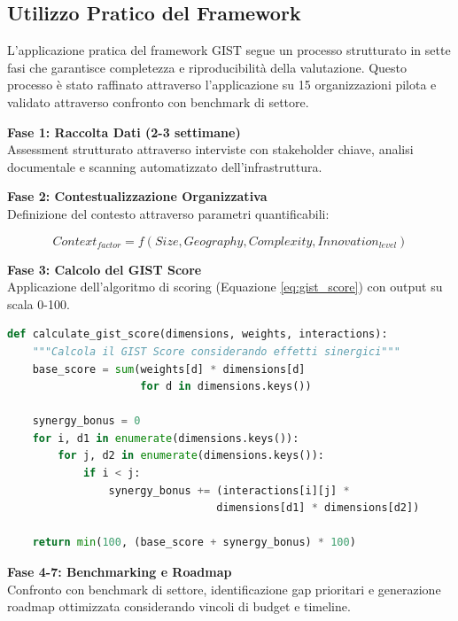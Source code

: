 \subsection{Utilizzo Pratico del Framework}

L'applicazione pratica del framework GIST segue un processo strutturato in sette fasi che garantisce completezza e riproducibilità della valutazione. Questo processo è stato raffinato attraverso l'applicazione su 15 organizzazioni pilota e validato attraverso confronto con benchmark di settore.

\textbf{Fase 1: Raccolta Dati (2-3 settimane)}\\
Assessment strutturato attraverso interviste con stakeholder chiave, analisi documentale e scanning automatizzato dell'infrastruttura.

\textbf{Fase 2: Contestualizzazione Organizzativa}\\
Definizione del contesto attraverso parametri quantificabili:

\begin{equation}
Context_{factor} = f(Size, Geography, Complexity, Innovation_{level})
\label{eq:context_factor}
\end{equation}

\textbf{Fase 3: Calcolo del GIST Score}\\
Applicazione dell'algoritmo di scoring (Equazione \ref{eq:gist_score}) con output su scala 0-100.

\begin{lstlisting}[language=Python, caption=Implementazione del Calcolo GIST Score]
def calculate_gist_score(dimensions, weights, interactions):
    """Calcola il GIST Score considerando effetti sinergici"""
    base_score = sum(weights[d] * dimensions[d] 
                     for d in dimensions.keys())
    
    synergy_bonus = 0
    for i, d1 in enumerate(dimensions.keys()):
        for j, d2 in enumerate(dimensions.keys()):
            if i < j:
                synergy_bonus += (interactions[i][j] * 
                                 dimensions[d1] * dimensions[d2])
    
    return min(100, (base_score + synergy_bonus) * 100)
\end{lstlisting}

\textbf{Fase 4-7: Benchmarking e Roadmap}\\
Confronto con benchmark di settore, identificazione gap prioritari e generazione roadmap ottimizzata considerando vincoli di budget e timeline.

